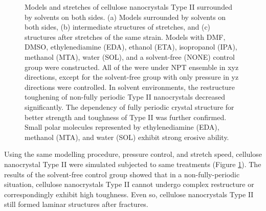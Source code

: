\documentclass{article}
\begin{document}
\begin{figure}[htbp]
\begin{subfigure}[b]{0.96\textwidth}
\begin{minipage}[b]{0.12\textwidth}
        \end{minipage}
        \subcaption{}
    \end{subfigure}
    \captionsetup{font=scriptsize}
    \caption{
    Models and stretches of cellulose nanocrystals Type II surrounded by solvents on both sides.
    (a) Models surrounded by solvents on both sides, (b) intermediate structures of stretches, and (c) structures after stretches of the same strain.
    Models with DMF, DMSO, ethylenediamine (EDA), ethanol (ETA), isopropanol (IPA), methanol (MTA), water (SOL), and a solvent-free (NONE) control group were constructed.
    All of the were under NPT ensemble in xyz directions, except for the solvent-free group with only pressure in yz directions were controlled.
    In solvent environments, the restructure toughening of non-fully periodic Type II nanocrystals decreased significantly.
    The dependency of fully periodic crystal structure for better strength and toughness of Type II was further confirmed.
    Small polar molecules represented by ethylenediamine (EDA), methanol (MTA), and water (SOL) exhibit strong erosive ability.
    }
    \label{fig:cellulose_nanocrystal_ii_with_solvent_around_fractures}
\end{figure}

Using the same modelling procedure, pressure control, and stretch speed, cellulose nanocrystal Type II were simulated subjected to same treatments (Figure \ref{fig:cellulose_nanocrystal_ii_with_solvent_around_fractures}).
The results of the solvent-free control group showed that in a non-fully-periodic situation, cellulose nanocrystals Type II cannot undergo complex restructure or correspondingly exhibit high toughness.
Even so, cellulose nanocrystals Type II still formed laminar structures after fractures.
\end{document}

